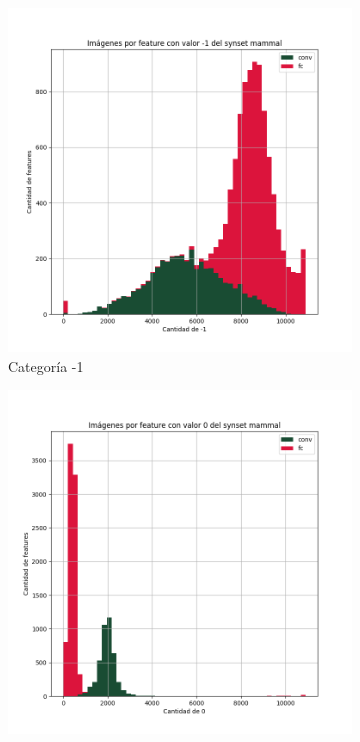 \documentclass[12,twoside]{TFG-GM}
\theoremstyle{definition}
\theoremstyle{remark}
\begin{document}
\begin{figure}[ht] 
	\centering
	\begin{subfigure}[b]{0.3\textwidth}
		\includegraphics[width=\textwidth] {Images/plots/25/synsets/Images_per_feature_of_-1_category_mammalall_layers.png}
		\caption{Categoría -1}
	\end{subfigure}
	\begin{subfigure}[b]{0.3\textwidth}
		\includegraphics[width=\textwidth]  {Images/plots/25/synsets/Images_per_feature_of_0_category_mammalall_layers.png}

\end{subfigure}
\end{figure}
\end{document}
